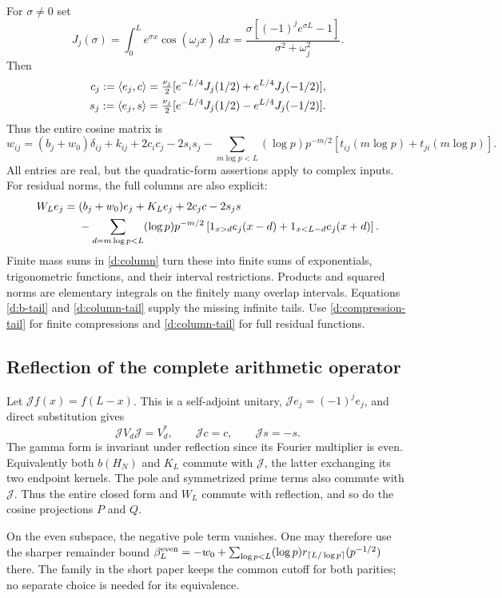 For $\sigma\ne0$ set
\[
J_j(\sigma)=\int_0^Le^{\sigma x}\cos(\omega_jx)\,dx
=\frac{\sigma[(-1)^je^{\sigma L}-1]}{\sigma^2+\omega_j^2}.
\]
Then
\begin{align*}
c_j:=\langle e_j,c\rangle&=\tfrac{\nu_j}{2}
[e^{-L/4}J_j(1/2)+e^{L/4}J_j(-1/2)],\\
s_j:=\langle e_j,s\rangle&=\tfrac{\nu_j}{2}
[e^{-L/4}J_j(1/2)-e^{L/4}J_j(-1/2)].
\end{align*}
Thus the entire cosine matrix is
\begin{equation}\label{d:W-entries}
w_{ij}=(b_j+w_0)\delta_{ij}+k_{ij}+2c_ic_j-2s_is_j
-\sum_{m\log p<L}(\log p)p^{-m/2}
[t_{ij}(m\log p)+t_{ji}(m\log p)].
\end{equation}
All entries are real, but the quadratic-form assertions apply to complex
inputs. For residual norms, the full columns are also explicit:
\begin{align}
W_Le_j={}&(b_j+w_0)e_j+K_Le_j+2c_jc-2s_js\notag\\
&-\sum_{d=m\log p<L}(\log p)p^{-m/2}
\left[1_{x>d}e_j(x-d)+1_{x<L-d}e_j(x+d)\right].
\label{d:W-columns}
\end{align}
Finite mass sums in \eqref{d:column} turn these into finite sums of
exponentials, trigonometric functions, and their interval restrictions.
Products and squared norms are elementary integrals on the finitely many
overlap intervals. Equations \eqref{d:b-tail} and \eqref{d:column-tail}
supply the missing infinite tails. Use \eqref{d:compression-tail} for
finite compressions and \eqref{d:column-tail} for full residual functions.

\subsection{Reflection of the complete arithmetic operator}
Let $\mathcal Jf(x)=f(L-x)$. This is a self-adjoint unitary,
$\mathcal Je_j=(-1)^je_j$, and direct substitution gives
\[
\mathcal JV_d\mathcal J=V_d^*,\qquad
\mathcal Jc=c,\qquad \mathcal Js=-s.
\]
The gamma form is invariant under reflection since its Fourier
multiplier is even. Equivalently both $b(H_N)$ and $K_L$ commute
with $\mathcal J$, the latter exchanging its two endpoint kernels.
The pole and symmetrized prime terms also commute with $\mathcal J$.
Thus the entire closed form and $W_L$ commute with reflection, and so
do the cosine projections $P$ and $Q$.

On the even subspace, the negative pole term vanishes. One may therefore
use the sharper remainder bound
$\beta_L^{\rm even}=-w_0+\sum_{\log p<L}(\log p)
r_{\lceil L/\log p\rceil}(p^{-1/2})$ there.
The family in the short paper keeps the common cutoff for both parities;
no separate choice is needed for its equivalence.

